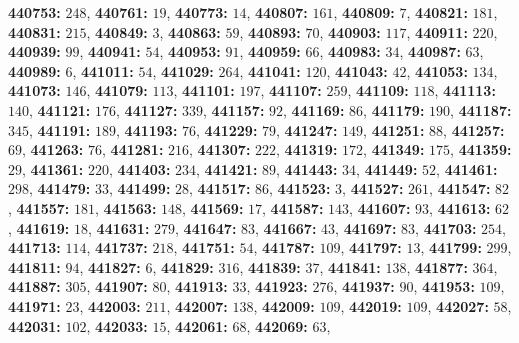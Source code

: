\textsf{\bfseries 440753:} $248$, \textsf{\bfseries 440761:} $19$, \textsf{\bfseries 440773:} $14$, \textsf{\bfseries 440807:} $161$, \textsf{\bfseries 440809:} $7$, \textsf{\bfseries 440821:} $181$, \textsf{\bfseries 440831:} $215$, \textsf{\bfseries 440849:} $3$, \textsf{\bfseries 440863:} $59$, \textsf{\bfseries 440893:} $70$, \textsf{\bfseries 440903:} $117$, \textsf{\bfseries 440911:} $220$, \textsf{\bfseries 440939:} $99$, \textsf{\bfseries 440941:} $54$, \textsf{\bfseries 440953:} $91$, \textsf{\bfseries 440959:} $66$, \textsf{\bfseries 440983:} $34$, \textsf{\bfseries 440987:} $63$, \textsf{\bfseries 440989:} $6$, \textsf{\bfseries 441011:} $54$, \textsf{\bfseries 441029:} $264$, \textsf{\bfseries 441041:} $120$, \textsf{\bfseries 441043:} $42$, \textsf{\bfseries 441053:} $134$, \textsf{\bfseries 441073:} $146$, \textsf{\bfseries 441079:} $113$, \textsf{\bfseries 441101:} $197$, \textsf{\bfseries 441107:} $259$, \textsf{\bfseries 441109:} $118$, \textsf{\bfseries 441113:} $140$, \textsf{\bfseries 441121:} $176$, \textsf{\bfseries 441127:} $339$, \textsf{\bfseries 441157:} $92$, \textsf{\bfseries 441169:} $86$, \textsf{\bfseries 441179:} $190$, \textsf{\bfseries 441187:} $345$, \textsf{\bfseries 441191:} $189$, \textsf{\bfseries 441193:} $76$, \textsf{\bfseries 441229:} $79$, \textsf{\bfseries 441247:} $149$, \textsf{\bfseries 441251:} $88$, \textsf{\bfseries 441257:} $69$, \textsf{\bfseries 441263:} $76$, \textsf{\bfseries 441281:} $216$, \textsf{\bfseries 441307:} $222$, \textsf{\bfseries 441319:} $172$, \textsf{\bfseries 441349:} $175$, \textsf{\bfseries 441359:} $29$, \textsf{\bfseries 441361:} $220$, \textsf{\bfseries 441403:} $234$, \textsf{\bfseries 441421:} $89$, \textsf{\bfseries 441443:} $34$, \textsf{\bfseries 441449:} $52$, \textsf{\bfseries 441461:} $298$, \textsf{\bfseries 441479:} $33$, \textsf{\bfseries 441499:} $28$, \textsf{\bfseries 441517:} $86$, \textsf{\bfseries 441523:} $3$, \textsf{\bfseries 441527:} $261$, \textsf{\bfseries 441547:} $82$, \textsf{\bfseries 441557:} $181$, \textsf{\bfseries 441563:} $148$, \textsf{\bfseries 441569:} $17$, \textsf{\bfseries 441587:} $143$, \textsf{\bfseries 441607:} $93$, \textsf{\bfseries 441613:} $62$, \textsf{\bfseries 441619:} $18$, \textsf{\bfseries 441631:} $279$, \textsf{\bfseries 441647:} $83$, \textsf{\bfseries 441667:} $43$, \textsf{\bfseries 441697:} $83$, \textsf{\bfseries 441703:} $254$, \textsf{\bfseries 441713:} $114$, \textsf{\bfseries 441737:} $218$, \textsf{\bfseries 441751:} $54$, \textsf{\bfseries 441787:} $109$, \textsf{\bfseries 441797:} $13$, \textsf{\bfseries 441799:} $299$, \textsf{\bfseries 441811:} $94$, \textsf{\bfseries 441827:} $6$, \textsf{\bfseries 441829:} $316$, \textsf{\bfseries 441839:} $37$, \textsf{\bfseries 441841:} $138$, \textsf{\bfseries 441877:} $364$, \textsf{\bfseries 441887:} $305$, \textsf{\bfseries 441907:} $80$, \textsf{\bfseries 441913:} $33$, \textsf{\bfseries 441923:} $276$, \textsf{\bfseries 441937:} $90$, \textsf{\bfseries 441953:} $109$, \textsf{\bfseries 441971:} $23$, \textsf{\bfseries 442003:} $211$, \textsf{\bfseries 442007:} $138$, \textsf{\bfseries 442009:} $109$, \textsf{\bfseries 442019:} $109$, \textsf{\bfseries 442027:} $58$, \textsf{\bfseries 442031:} $102$, \textsf{\bfseries 442033:} $15$, \textsf{\bfseries 442061:} $68$, \textsf{\bfseries 442069:} $63$, 
